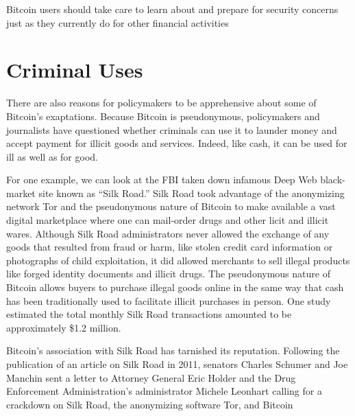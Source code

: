Bitcoin users should take
care to learn about and prepare for security concerns just as they
currently do for other financial activities

\section{Criminal Uses}

There are also reasons for policymakers to be apprehensive
about some of Bitcoin’s exaptations. Because Bitcoin is pseudonymous,
policymakers and journalists have questioned whether
criminals can use it to launder money and accept payment for
illicit goods and services. Indeed, like cash, it can be used for ill
as well as for good.

For one example, we can look at the FBI taken down infamous Deep Web
black-market site known as “Silk Road.” Silk Road took advantage
of the anonymizing network Tor and the pseudonymous
nature of Bitcoin to make available a vast digital marketplace
where one can mail-order drugs and other licit and illicit wares.
Although Silk Road administrators never allowed the exchange
of any goods that resulted from fraud or harm, like stolen credit
card information or photographs of child exploitation, it did
allowed merchants to sell illegal products like forged identity documents
and illicit drugs. The pseudonymous nature of Bitcoin
allows buyers to purchase illegal goods online in the same way
that cash has been traditionally used to facilitate illicit purchases
in person. One study estimated the total monthly Silk Road
transactions amounted to be approximately \$1.2 million.

Bitcoin’s association with Silk Road has tarnished its reputation.
Following the publication of an article on Silk Road in 2011, senators Charles Schumer and Joe Manchin sent a letter
to Attorney General Eric Holder and the Drug Enforcement
Administration’s administrator Michele Leonhart calling for
a crackdown on Silk Road, the anonymizing software Tor, and
Bitcoin

